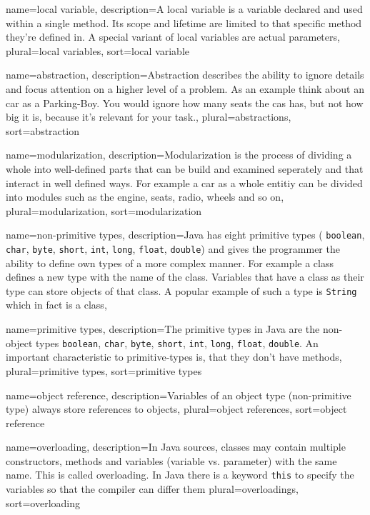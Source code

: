 {
	name=local variable,
	description={A local variable is a variable declared and used within a
		single method. Its scope and lifetime are limited to that
		specific method they're defined in. A special variant of local
		variables are actual parameters},
	plural=local variables,
	sort=local variable
}

{
	name=abstraction,
	description={Abstraction describes the ability to ignore details and
		focus attention on a higher level of a problem. As an example
		think about an car as a Parking-Boy. You would ignore how
		many seats the cas has, but not how big it is, because it's
		relevant for your task.},
	plural=abstractions,
	sort=abstraction
}

{
	name=modularization,
	description={Modularization is the process of dividing a whole into
		well-defined parts that can be build and examined seperately
		and that interact in well defined ways. For example a car as
		a whole entitiy can be divided into modules such as the
		engine, seats, radio, wheels and so on},
	plural=modularization,
	sort=modularization
}

{
	name=non-primitive types,
	description={Java has eight primitive types (
		\lstinline?boolean?, \lstinline?char?,
		\lstinline?byte?, \lstinline?short?, \lstinline?int?, 
		\lstinline?long?, \lstinline?float?, \lstinline?double?) and
		gives the programmer the ability to define own types of a
		more complex manner. For example a class defines a new type 
		with the name of the class. Variables that have a class as
		their type can store objects of that class. A popular 
		example of such a type is \lstinline?String? which in fact
		is a class},
}

{
	name=primitive types,
	description={The primitive types in Java are the non-object types
		\lstinline?boolean?, \lstinline?char?,
		\lstinline?byte?, \lstinline?short?, \lstinline?int?, 
		\lstinline?long?, \lstinline?float?, \lstinline?double?.
		An important characteristic to primitive-types is, that they
		don't have methods},
	plural=primitive types,
	sort=primitive types
}

{
	name=object reference,
	description={Variables of an object type (non-primitive type) always
		store references to objects},
	plural=object references,
	sort=object reference
}

{
	name=overloading,
	description={In Java sources, classes may contain multiple constructors,
		methods and variables (variable vs. parameter) with the same 
		name. This is called overloading. In Java there is a keyword 
		\lstinline?this? to
		specify the variables so that the compiler can differ them}
	plural=overloadings,
	sort=overloading
}

